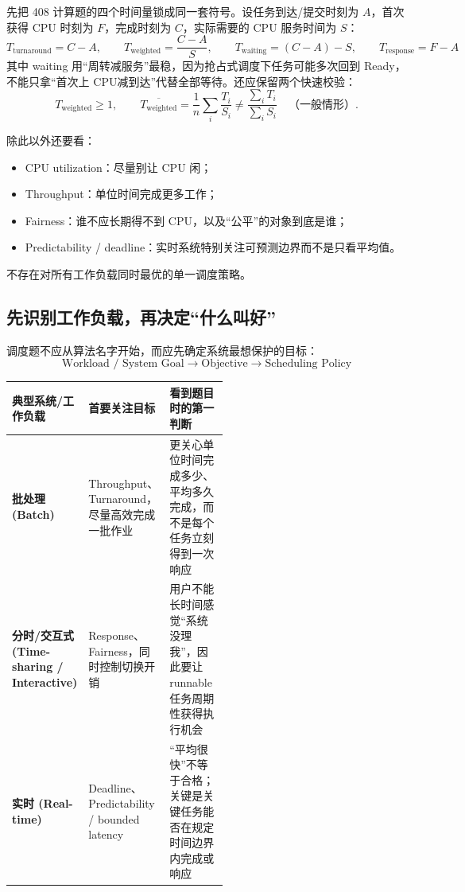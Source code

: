 \documentclass[11pt,a4paper]{ctexart}
\begin{document}
先把 408 计算题的四个时间量锁成同一套符号。设任务到达/提交时刻为 $A$，首次获得 CPU 时刻为 $F$，完成时刻为 $C$，实际需要的 CPU 服务时间为 $S$：
\[
\boxed{
T_{\text{turnaround}}=C-A,
\qquad
T_{\text{weighted}}=\frac{C-A}{S},
\qquad
T_{\text{waiting}}=(C-A)-S,
\qquad
T_{\text{response}}=F-A
}
\]
其中 waiting 用“周转减服务”最稳，因为抢占式调度下任务可能多次回到 Ready，不能只拿“首次上 CPU减到达”代替全部等待。还应保留两个快速校验：
\[
T_{\text{weighted}}\ge 1,
\qquad
\overline{T_{\text{weighted}}}=\frac{1}{n}\sum_i\frac{T_i}{S_i}
\neq
\frac{\sum_i T_i}{\sum_i S_i}\quad\text{（一般情形）}.
\]

除此以外还要看：
\begin{itemize}
\item CPU utilization：尽量别让 CPU 闲；
\item Throughput：单位时间完成更多工作；
\item Fairness：谁不应长期得不到 CPU，以及“公平”的对象到底是谁；
\item Predictability / deadline：实时系统特别关注可预测边界而不是只看平均值。
\end{itemize}

不存在对所有工作负载同时最优的单一调度策略。

\subsection{先识别工作负载，再决定“什么叫好”}

调度题不应从算法名字开始，而应先确定系统最想保护的目标：
\[
\boxed{\text{Workload / System Goal}\rightarrow\text{Objective}\rightarrow\text{Scheduling Policy}}
\]

\begingroup
\small
\renewcommand{\arraystretch}{1.25}
\setlength{\tabcolsep}{5pt}
\begin{tabularx}{\linewidth}{>{\bfseries}p{0.23\linewidth} p{0.31\linewidth} X}
\toprule
典型系统/工作负载 & 首要关注目标 & 看到题目时的第一判断\\
\midrule
批处理 (Batch) & Throughput、Turnaround，尽量高效完成一批作业 & 更关心单位时间完成多少、平均多久完成，而不是每个任务立刻得到一次响应\\
分时/交互式 (Time-sharing / Interactive) & Response、Fairness，同时控制切换开销 & 用户不能长时间感觉“系统没理我”，因此要让 runnable 任务周期性获得执行机会\\
实时 (Real-time) & Deadline、Predictability / bounded latency & “平均很快”不等于合格；关键是关键任务能否在规定时间边界内完成或响应\\
\bottomrule
\end{tabularx}
\endgroup
\end{document}
